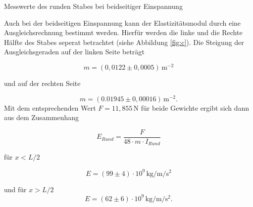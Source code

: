 \begin{table}[H]
  \centering
  
  
  \caption{Messwerte des runden Stabes bei beidseitiger Einspannung}
  \label{tab:e}
\end{table}
Auch bei der beidseitigen Einspannung kann der Elastizitätsmodul
durch eine Ausgleichsrechnung bestimmt werden. Hierfür werden
die linke und die Rechte Hälfte des Stabes seperat betrachtet
(siehe Abbildung \ref{fig:c}). Die Steigung der Ausgleichsgeraden auf der linken Seite beträgt

\begin{equation*}
  m=(0,0122 \pm 0,0005)\,\si{\meter\tothe{-2}}
\end{equation*}

\noindent und auf der rechten Seite

\begin{equation*}
  m=(0.01945 \pm 0,00016)\,\si{\meter\tothe{-2}}.
\end{equation*}
\noindent Mit dem entsprechenden Wert $F=11,855 \, \si{\newton}$
für beide Gewichte ergibt sich dann aus dem Zusammenhang

\begin{equation}
  E_{Rund}=\frac{F}{48 \cdot m \cdot I_{Rund}}
\end{equation}

\noindent für $x<L/2$

\begin{equation*}
  E=(99 \pm 4) \cdot 10^9 \,\si{\kilo\gram\per\meter\per\second\squared}
\end{equation*}


\noindent und für $x>L/2$
\begin{equation*}
  E=(62 \pm 6) \cdot 10^9 \,\si{\kilo\gram\per\meter\per\second\squared}.
\end{equation*}

